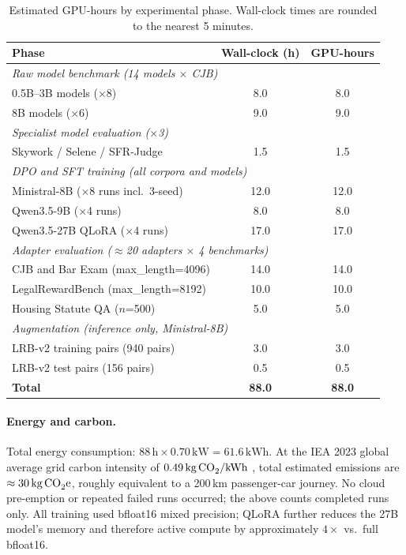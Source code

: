 \documentclass{article}
\theoremstyle{plain}
\theoremstyle{definition}
\theoremstyle{remark}
\begin{document}
\begin{table}[h]
\centering
\caption{Estimated GPU-hours by experimental phase. Wall-clock times are rounded to the nearest 5 minutes.}
\label{app:tab:compute}
\small
\setlength{\tabcolsep}{1.5pt}
\begin{tabular}{lcc}
\toprule
\textbf{Phase} & \textbf{Wall-clock (h)} & \textbf{GPU-hours} \\
\midrule
\multicolumn{3}{l}{\textit{Raw model benchmark (14 models $\times$ CJB)}} \\
\quad 0.5B--3B models ($\times$8) & 8.0 & 8.0 \\
\quad 8B models ($\times$6) & 9.0 & 9.0 \\
\multicolumn{3}{l}{\textit{Specialist model evaluation ($\times$3)}} \\
\quad Skywork / Selene / SFR-Judge & 1.5 & 1.5 \\
\multicolumn{3}{l}{\textit{DPO and SFT training (all corpora and models)}} \\
\quad Ministral-8B ($\times$8 runs incl.\ 3-seed) & 12.0 & 12.0 \\
\quad Qwen3.5-9B ($\times$4 runs) & 8.0 & 8.0 \\
\quad Qwen3.5-27B QLoRA ($\times$4 runs) & 17.0 & 17.0 \\
\multicolumn{3}{l}{\textit{Adapter evaluation ($\approx$20 adapters $\times$ 4 benchmarks)}} \\
\quad CJB and Bar Exam (max\_length=4096) & 14.0 & 14.0 \\
\quad LegalRewardBench (max\_length=8192) & 10.0 & 10.0 \\
\quad Housing Statute QA ($n$=500) & 5.0 & 5.0 \\
\multicolumn{3}{l}{\textit{Augmentation (inference only, Ministral-8B)}} \\
\quad LRB-v2 training pairs (940 pairs) & 3.0 & 3.0 \\
\quad LRB-v2 test pairs (156 pairs) & 0.5 & 0.5 \\
\midrule
\textbf{Total} & \textbf{88.0} & \textbf{88.0} \\
\bottomrule
\end{tabular}
\end{table}

\paragraph{Energy and carbon.}
Total energy consumption: $88\,\text{h} \times 0.70\,\text{kW} = 61.6\,\text{kWh}$.  At the IEA 2023 global average grid carbon intensity of $0.49\,\text{kg\,CO}_2\text{/kWh}$ \citep{iea2023}, total estimated emissions are $\approx 30\,\text{kg\,CO}_2\text{e}$, roughly equivalent to a 200\,km passenger-car journey.  No cloud pre-emption or repeated failed runs occurred; the above counts completed runs only.  All training used bfloat16 mixed precision; QLoRA further reduces the 27B model's memory and therefore active compute by approximately $4\times$ vs.\ full bfloat16.
\end{document}
